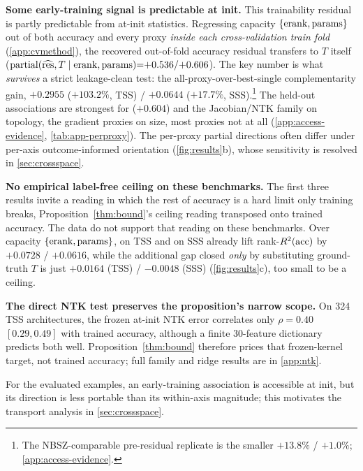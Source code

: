 \noindent\textbf{Some early-training signal is predictable at init.}\label{find:accessible}\label{find:access}\label{sec:result3}{}
This trainability residual is partly predictable from at-init statistics.
Regressing capacity $\{\operatorname{erank},\mathrm{params}\}$ out of both accuracy and every proxy
\emph{inside each cross-validation train fold} (\cref{app:cvmethod}), the recovered
out-of-fold accuracy residual transfers to $T$ itself
($\operatorname{partial}(\widehat{\mathrm{res}},T\mid\operatorname{erank},\mathrm{params}){=}{+}0.536/{+}0.606$).
The key number is what \emph{survives} a strict leakage-clean test: the
all-proxy-over-best-single complementarity gain, ${+}0.2955$ (${+}103.2\%$, TSS) /
${+}0.0644$ (${+}17.7\%$, SSS).\footnote{The NBSZ-comparable pre-residual replicate
is the smaller ${+}13.8\%$ / ${+}1.0\%$; \cref{app:access-evidence}.} The held-out
associations are strongest for  (${+}0.604$)
and the Jacobian/NTK family on topology, the gradient proxies on size, most proxies
not at all (\cref{app:access-evidence}, \cref{tab:app-perproxy}). The per-proxy
partial directions often differ under per-axis outcome-informed orientation
(\cref{fig:results}b), whose sensitivity is resolved in \cref{sec:crossspace}.

\noindent\textbf{No empirical label-free ceiling on these benchmarks.}%
\label{find:noceiling}\label{find:ceiling}\label{sec:result5}{}
The first three results invite a reading in which the rest of accuracy is a hard
limit only training breaks, Proposition~\ref{thm:bound}'s ceiling reading
transposed onto trained accuracy. The data do not support that reading on these
benchmarks. Over capacity $\{\operatorname{erank},\mathrm{params}\}$,  on TSS and 
on SSS already lift rank-$R^2(\mathrm{acc})$ by ${+}0.0728$ / ${+}0.0616$, while the additional gap
closed \emph{only} by substituting ground-truth $T$ is just ${+}0.0164$ (TSS) /
${-}0.0048$ (SSS) (\cref{fig:results}c), too small to be a ceiling.

\noindent\textbf{The direct NTK test preserves the proposition's narrow scope.}
On 324 TSS architectures, the frozen at-init NTK error correlates only
$\rho{=}0.40$ $[0.29,0.49]$ with trained accuracy, although a finite 30-feature
dictionary predicts both well. Proposition~\ref{thm:bound} therefore prices that
frozen-kernel target, not trained accuracy; full family and ridge results are in
\cref{app:ntk}.

\smallskip
\noindent
For the evaluated examples, an early-training association is accessible at init,
but its direction is less portable than its within-axis magnitude; this motivates
the transport analysis in \cref{sec:crossspace}.
